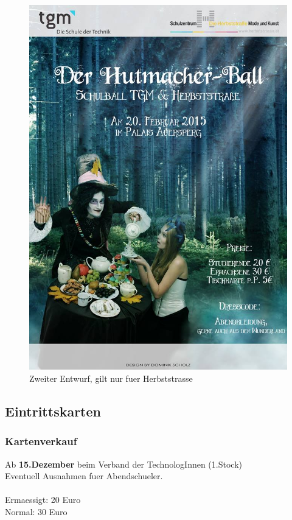 \documentclass[12pt]{article}
\begin{document}
\begin{figure}[here!]
\begin{minipage}[h]{0.25\textwidth}
\includegraphics[width=1.0\textwidth]{fertig} 
    \caption{Zweiter Entwurf, gilt nur fuer Herbststrasse}
    \label{fig:eai1}
\end{minipage}
\end{figure}
\subsection{Eintrittskarten}
\subsubsection{Kartenverkauf}
Ab \textbf{ 15.Dezember} beim  Verband der TechnologInnen (1.Stock) \\
Eventuell Ausnahmen fuer Abendschueler. \\ \\
Ermaessigt: 20 Euro \\
Normal: 30 Euro
\end{document}
